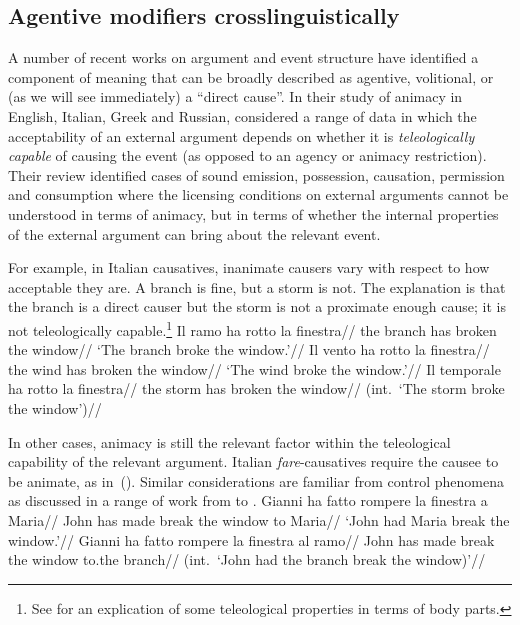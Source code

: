 	\subsection{Agentive modifiers crosslinguistically} \label{voice:va:act}
A number of recent works on argument and event structure have identified a component of meaning that can be broadly described as agentive, volitional, or (as we will see immediately) a ``direct cause''. In their study of animacy in English, Italian, Greek and Russian, \cite{folliharley08} considered a range of data in which the acceptability of an external argument depends on whether it is \emph{teleologically capable} of causing the event (as opposed to an agency or animacy restriction). Their review identified cases of sound emission, possession, causation, permission and consumption where the licensing conditions on external arguments cannot be understood in terms of animacy, but in terms of whether the internal properties of the external argument can bring about the relevant event.

For example, in Italian causatives, inanimate causers vary with respect to how acceptable they are. A branch is fine, but a storm is not. The explanation is that the branch is a direct causer but the storm is not a proximate enough cause; it is not teleologically capable.\footnote{See \cite{irwin18tlr} for an explication of some teleological properties in terms of body parts.}
\pex
	\a \begingl
		\gla Il ramo ha rotto la finestra//
		\glb the branch has broken the window//
		\glft `The branch broke the window.'//
		\endgl
	\a \begingl
		\gla {}Il vento ha rotto la finestra//
		\glb the wind has broken the window//
		\glft `The wind broke the window.'//
		\endgl
	\a \begingl
		\gla \ljudge{\#}Il temporale ha rotto la finestra//
		\glb the storm has broken the window//
		\glft (int.~`The storm broke the window')//
		\endgl
\xe		

In other cases, animacy is still the relevant factor within the teleological capability of the relevant argument. Italian \emph{fare}-causatives require the causee to be animate, as in~(\nextx). Similar considerations are familiar from control phenomena as discussed in a range of work from \cite{farkas88} to \cite{zu18phd}.
\pex
	\a \begingl
		\gla Gianni ha fatto rompere la finestra a Maria//
		\glb John has made break the window to Maria//
		\glft `John had Maria break the window.'//
		\endgl
	\a \begingl
		\gla \ljudge{\#}Gianni ha fatto rompere la finestra al ramo//
		\glb John has made break the window to.the branch//
		\glft (int.~`John had the branch break the window)'//
		\endgl
\xe	

